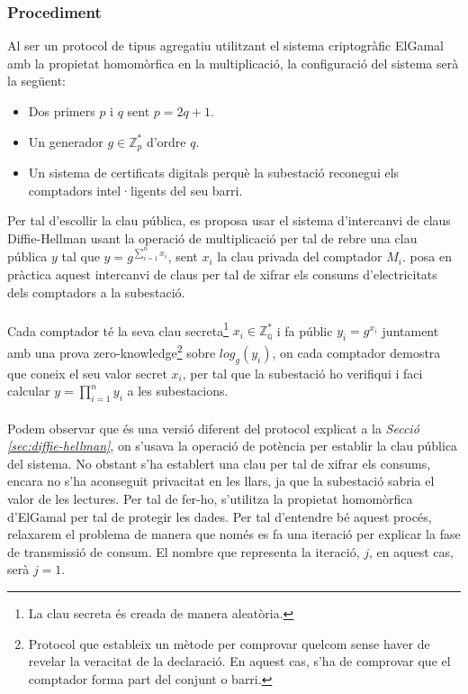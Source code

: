 \subsubsection{Procediment}
Al ser un protocol de tipus agregatiu utilitzant el sistema criptogràfic ElGamal amb la propietat homomòrfica en la multiplicació, la configuració del sistema serà la següent:
\begin{itemize}
	\item Dos primers $p$ i $q$ sent $p = 2q+1$.
	\item Un generador $g \in \mathbb{Z}_p^*$ d'ordre $q$.
	\item Un sistema de certificats digitals perquè la subestació reconegui els comptadors intel·ligents del seu barri.
\end{itemize}
Per tal d'escollir la clau pública, es proposa usar el sistema d'intercanvi de claus Diffie-Hellman usant la operació de multiplicació per tal de rebre una clau pública $y$ tal que $y=g^{\sum_{i=1}^{n} x_i}$, sent $x_i$ la clau privada del comptador $M_i$. \cite{busom} posa en pràctica aquest intercanvi de claus per tal de xifrar els consums d'electricitats dels comptadors a la subestació. 
\\
\\
Cada comptador té la seva clau secreta\footnote{La clau secreta és creada de manera aleatòria.} $x_i \in \mathbb{Z_q^*} $ i fa públic $y_i = g^{x_i}$ juntament amb una prova zero-knowledge\footnote{Protocol que estableix un mètode per comprovar quelcom sense haver de revelar la veracitat de la declaració. En aquest cas, s'ha de comprovar que el comptador forma part del conjunt o barri.} sobre $log_g(y_i)$, on cada comptador demostra que coneix el seu valor secret $x_i$, per tal que la subestació ho verifiqui i faci calcular $y = \prod_{i=1}^{n} y_i$ a les subestacions.
\\
\\
Podem observar que és una versió diferent del protocol explicat a la \textit{Secció \ref{sec:diffie-hellman}}, on s'usava la operació de potència per establir la clau pública del sistema.
No obstant s'ha establert una clau per tal de xifrar els consums, encara no s'ha aconseguit privacitat en les llars, ja que la subestació sabria el valor de les lectures. Per tal de fer-ho, s'utilitza la propietat homomòrfica d'ElGamal per tal de protegir les dades. Per tal d'entendre bé aquest procés, relaxarem el problema de manera que només es fa una iteració per explicar la fase de transmissió de consum. El nombre que representa la iteració, $j$, en aquest cas, serà $j = 1$.
